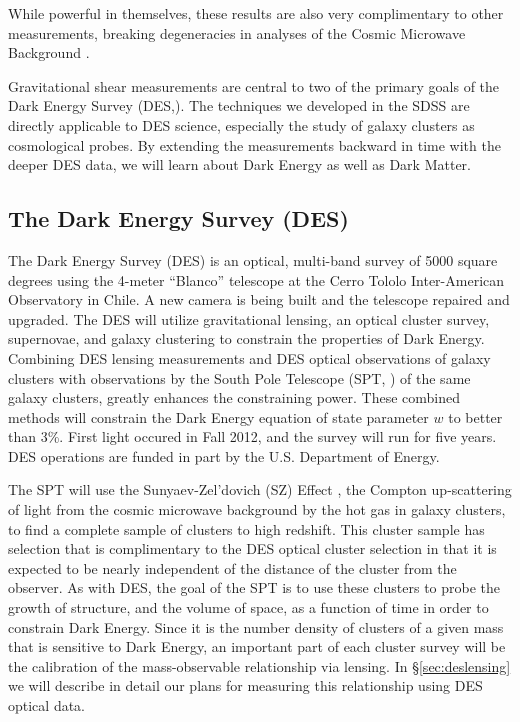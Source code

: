 \documentclass[12pt]{article}
\newcommand{\commissdate}{Fall 2012}
\begin{document}
While powerful in themselves, these results are also very complimentary to
other measurements, breaking degeneracies in analyses of the Cosmic Microwave
Background \cite{KomatsuWMAPCosmo09}. 

Gravitational shear measurements are central to two of the primary goals of the
Dark Energy Survey (DES,\cite{sec:des}).  The techniques we developed in the
SDSS are directly applicable to DES science, especially the study of galaxy
clusters as cosmological probes.  By extending the measurements backward in
time with the deeper DES data, we will learn about Dark Energy as well as Dark
Matter.


\subsection{The Dark Energy Survey (DES)} \label{sec:des}

The Dark Energy Survey (DES) is an optical, multi-band survey of 5000 square
degrees using the 4-meter ``Blanco'' telescope at the Cerro Tololo
Inter-American Observatory in Chile. A new camera is being built and the
telescope repaired and upgraded.  The DES will utilize gravitational lensing,
an optical cluster survey, supernovae, and galaxy clustering to constrain the
properties of Dark Energy.  Combining DES lensing measurements and DES optical
observations of galaxy clusters with observations by the South Pole Telescope
(SPT, \cite{SPT04}) of the same galaxy clusters, greatly enhances the
constraining power.  These combined methods will constrain the Dark Energy
equation of state parameter $w$ to better than 3\%.  First light occured in
\commissdate, and the survey will run for five years.  DES operations are
funded in part by the U.S.  Department of Energy. 


The SPT will use the Sunyaev-Zel'dovich (SZ) Effect \cite{Birkinshaw99}, the
Compton up-scattering of light from the cosmic microwave background by the hot
gas in galaxy clusters, to find a complete sample of clusters to high redshift.
This cluster sample has selection that is complimentary to the DES optical
cluster selection in that it is expected to be nearly independent of the
distance of the cluster from the observer.  As with DES, the goal of the SPT is
to use these clusters to probe the growth of structure, and the volume of
space, as a function of time in order to constrain Dark Energy.  Since it is
the number density of clusters of a given mass that is sensitive to Dark
Energy, an important part of each cluster survey will be the calibration of the
mass-observable relationship via lensing.  In \S \ref{sec:deslensing} we will
describe in detail our plans for measuring this relationship using DES optical
data.
\end{document}
